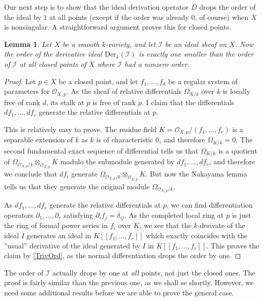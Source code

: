 \documentclass[12pt,a4paper,leqno]{article}
\newcommand{\OO}{\mathcal{O}}
\newcommand{\der}{\mathrm{Der}}
\newcommand{\fref}[1]{\hyperref[{#1}]{\ref*{#1}}}
\theoremstyle{plain}
\newtheorem{lem}[theo]{Lemma}
\theoremstyle{definition}
\theoremstyle{remark}
\begin{document}
Our next step is to show that the ideal derivation operator $D$ drops the order of the ideal by $1$ at all points (except if the order was already 0, of course) when $X$ is nonsingular. A straightforward argument proves this for closed points.

\begin{lem}\label{derivativeAtClosedPoints}
Let $X$ be a smooth $k$-variety, and let $\mathscr{I}$ be an ideal sheaf on $X$. Now the order of the derivative ideal $\der_k (\mathscr{I})$ is exactly one smaller than the order of $\mathscr{I}$ at all closed points of $X$ where $\mathscr{I}$ had a nonzero order.
\end{lem}
\begin{proof}
Let $p \in X$ be a closed point, and  let $f_1,...,f_d$ be a regular system of parameters for $\OO_{X,p}$. As the sheaf of relative differentials $\Omega_{X/k}$ over $k$ is locally free of rank $d$, its stalk at $p$ is free of rank $p$. I claim that the differentials $df_1, ..., df_r$ generate the relative differentials at $p$.

This is relatively easy to prove. The residue field $K = \OO_{X,p} / (f_1,...,f_r)$ is a separable extension of $k$ as $k$ is of characteristic 0, and therefore $\Omega_{K/k} = 0$. The second fundamental exact sequence of differential tells us that $\Omega_{K/k}$ is a quotient of $\Omega_{\OO_{X,p} / k} \otimes_{\OO_{X,p}} K$ modulo the submodule generated by $df_1, ..., df_r$, and therefore we conclude that $df_i$ generate $\Omega_{\OO_{X,p} / k} \otimes_{\OO_{X,p}} K$. But now the Nakayama lemma tells us that they generate the original module $\Omega_{\OO_{X,p} / k}$.

As $df_1, ..., df_r$ generate the relative differentials at $p$, we can find differentiation operators $\partial_1,...,\partial_r$ satisfying $\partial_i f_j = \delta_{ij}$. As the completed local ring at $p$ is just the ring of formal power series in $f_i$ over $K$, we see that the $k$-derivate of the ideal $I$ generates an ideal in $K [[f_1,...,f_r]]$ which exactly coincides with the ''usual'' derivative of the ideal generated by $I$ in $K [[f_1,...,f_r]]$. This proves the claim by \fref{TrivOrd}, as the normal differentiation drops the order by one.
\end{proof}

The order of $\mathscr{I}$ actually drops by one at \emph{all} points, not just the closed ones. The proof is fairly similar than the previous one, as we shall se shortly. However, we need some  additional results before we are able to prove the general case.
\end{document}
